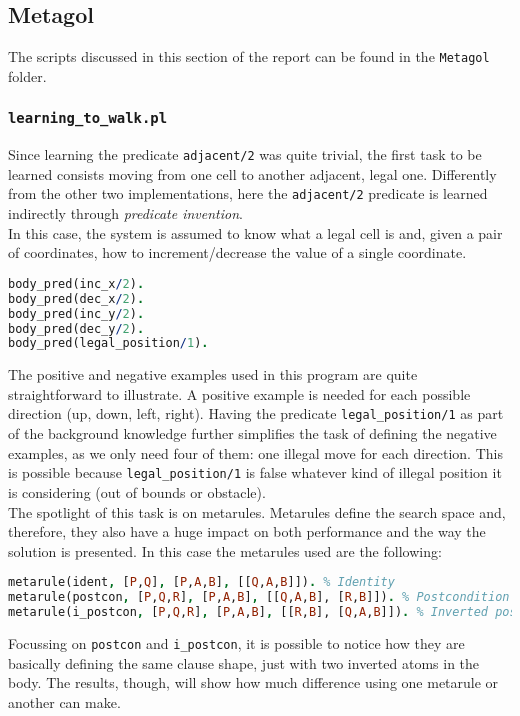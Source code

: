 \subsection{Metagol}
The scripts discussed in this section of the report can be found in the \texttt{Metagol} folder.\\


\subsubsection{\texttt{learning\_to\_walk.pl}}
Since learning the predicate \texttt{adjacent/2} was quite trivial, the first task to be learned
consists moving from one cell to another adjacent, legal
one. Differently from the other two implementations, here the \texttt{adjacent/2} predicate is learned
indirectly through \emph{predicate invention}.\\
In this case, the system is assumed to know what a legal cell is and, given a pair of coordinates, how
to increment/decrease the value of a single coordinate.
\begin{lstlisting}[label={lst:bk_ltw}, language=Prolog, caption=Background Knowledge to walk, belowcaptionskip=1cm]
body_pred(inc_x/2).
body_pred(dec_x/2).
body_pred(inc_y/2).
body_pred(dec_y/2).
body_pred(legal_position/1).   
\end{lstlisting}
The positive and negative examples used in this program are quite straightforward to illustrate. A positive example
is needed for each possible direction (up, down, left, right). Having the predicate \texttt{legal\_position/1} as part 
of the background knowledge further simplifies the task of defining the negative examples, as we only need four of them:
one illegal move for each direction. This is possible because \texttt{legal\_position/1} is false whatever kind of illegal
position it is considering (out of bounds or obstacle).\\


The spotlight of this task is on metarules. Metarules define the search space and, therefore, they also have
a huge impact on both performance and the way the solution is presented. In this case the metarules used are
the following:
\begin{lstlisting}[language=Prolog, caption=Metarules in \texttt{learning\_to\_walk.pl}, belowcaptionskip=1cm]
metarule(ident, [P,Q], [P,A,B], [[Q,A,B]]). % Identity
metarule(postcon, [P,Q,R], [P,A,B], [[Q,A,B], [R,B]]). % Postcondition
metarule(i_postcon, [P,Q,R], [P,A,B], [[R,B], [Q,A,B]]). % Inverted postcondition  
\end{lstlisting}
Focussing on \texttt{postcon} and \texttt{i\_postcon}, it is possible to notice how they are basically defining
the same clause shape, just with two inverted atoms in the body. The results, though, will show how much difference
using one metarule or another can make.

